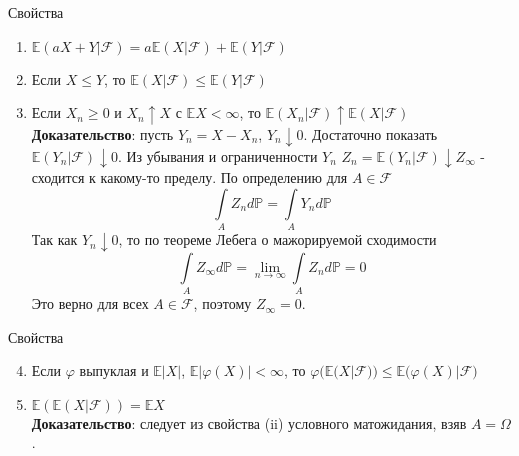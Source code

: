 \documentclass{beamer}%
\theoremstyle{definition}
\renewcommand{\P}{\mathbb{P}}
\newcommand{\F}{\mathcal{F}}
\begin{document}
\begin{frame}{Свойства}

\begin{enumerate}
\item $\mathbb{E}(aX+Y|\F)=a\mathbb{E}(X|\F)+\mathbb{E}(Y|\F)$
\item Если $X\leqslant Y$, то $\mathbb{E}(X|\F)\leqslant\mathbb{E}(Y|\F)$
\item Если $X_n\geqslant0$ и $X_n\uparrow X$ с $\mathbb{E}X<\infty$, то $\mathbb{E}(X_n|\F)\uparrow\mathbb{E}(X|\F)$
\\
\textbf{Доказательство}: пусть $Y_n=X-X_n$, $Y_n\downarrow0$. Достаточно показать $\mathbb{E}(Y_n|\F)\downarrow0$. Из убывания и ограниченности $Y_n$ $Z_n=\mathbb{E}(Y_n|\F)\downarrow Z_{\infty}$ - сходится к какому-то пределу. По определению для $A\in\F$
$$\int\limits_AZ_nd\P=\int\limits_AY_nd\P$$
Так как $Y_n\downarrow0$, то по теореме Лебега о мажорируемой сходимости
$$\int\limits_AZ_{\infty}d\P=\lim\limits_{n\to\infty}\int\limits_AZ_nd\P=0$$
Это верно для всех $A\in\F$, поэтому $Z_{\infty}=0$.
\end{enumerate}

\end{frame}


\begin{frame}{Свойства}

\begin{enumerate}
\setcounter{enumi}{3}
\item Если $\varphi$ выпуклая и $\mathbb{E}|X|$, $\mathbb{E}|\varphi(X)|<\infty$, то $\varphi\big(\mathbb{E}(X|\F)\big)\leqslant\mathbb{E}\big(\varphi(X)|\F\big)$
\item $\mathbb{E}(\mathbb{E}(X|\F))=\mathbb{E}X$
\\
\textbf{Доказательство}: следует из свойства (ii) условного матожидания, взяв $A=\Omega$.
\end{enumerate}

\end{frame}
\end{document}
